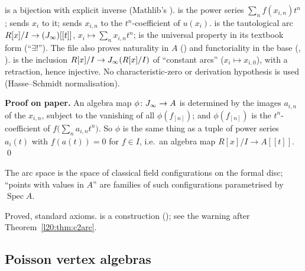 \begin{dictionary}
 is a bijection with explicit inverse (Mathlib's ).  is the
power series $\sum_nf(x_{i,n})t^n$;  sends $x_i$ to it;  sends $x_{i,n}$ to the
$t^n$-coefficient of $u(x_i)$.  is the tautological arc $R[x]/I\to(J_\infty)[[t]]$,
$x_i\mapsto\sum_nx_{i,n}t^n$;  is the universal property in its textbook form
(``$\exists!$''). The file also proves naturality in $A$ () and functoriality in the base
(, ).  is the inclusion $R[x]/I\to J_\infty(R[x]/I)$ of
``constant arcs'' ($x_i\mapsto x_{i,0}$), with a retraction, hence injective. No characteristic-zero or
derivation hypothesis is used (Hasse--Schmidt normalisation).
\end{dictionary}

\textbf{Proof on paper.} An algebra map $\phi\colon J_\infty\to A$ is determined by the images $a_{i,n}$ of
the $x_{i,n}$, subject to the vanishing of all $\phi(f_{[n]})$; and $\phi(f_{[n]})$ is the $t^n$-coefficient of
$f\bigl(\sum_na_{i,n}t^n\bigr)$. So $\phi$ is the same thing as a tuple of power series $a_i(t)$ with
$f(a(t))=0$ for $f\in I$, i.e.\ an algebra map $R[x]/I\to A[[t]]$. \qed

\begin{physics}
The arc space is the space of classical field configurations on the formal disc; ``points with values in
$A$'' are families of such configurations parametrised by $\operatorname{Spec}A$.
\end{physics}

\begin{status}
Proved, standard axioms.  is a construction (); see the warning
after Theorem~\ref{l20:thm:c2arc}.
\end{status}

\subsection{Poisson vertex algebras}

